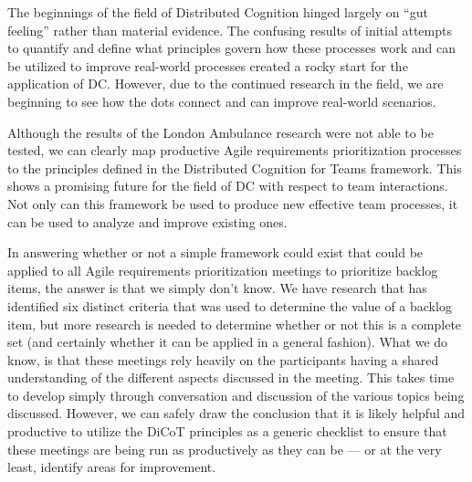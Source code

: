 The beginnings of the field of Distributed Cognition hinged largely on ``gut feeling'' rather than material evidence. The confusing results of initial attempts to quantify and define what principles govern how these processes work and can be utilized to improve real-world processes created a rocky start for the application of DC\@. However, due to the continued research in the field, we are beginning to see how the dots connect and can improve real-world scenarios.

Although the results of the London Ambulance research were not able to be tested, we can clearly map productive Agile requirements prioritization processes to the principles defined in the Distributed Cognition for Teams framework. This shows a promising future for the field of DC with respect to team interactions. Not only can this framework be used to produce new effective team processes, it can be used to analyze and improve existing ones.

In answering whether or not a simple framework could exist that could be applied to all Agile requirements prioritization meetings to prioritize backlog items, the answer is that we simply don't know. We have research that has identified six distinct criteria that was used to determine the value of a backlog item, but more research is needed to determine whether or not this is a complete set (and certainly whether it can be applied in a general fashion). What we do know, is that these meetings rely heavily on the participants having a shared understanding of the different aspects discussed in the meeting. This takes time to develop simply through conversation and discussion of the various topics being discussed. However, we can safely draw the conclusion that it is likely helpful and productive to utilize the DiCoT principles as a generic checklist to ensure that these meetings are being run as productively as they can be --- or at the very least, identify areas for improvement.
